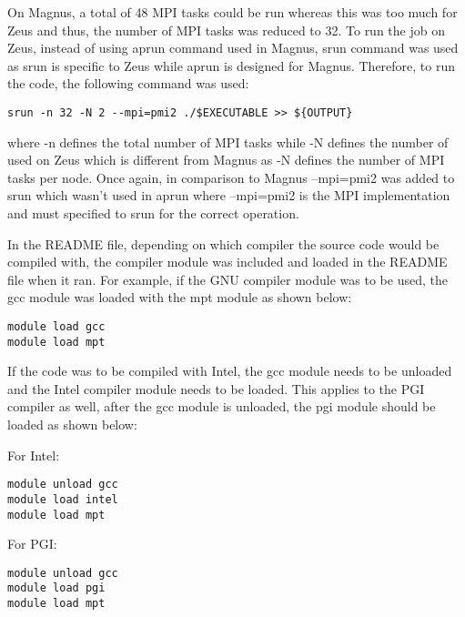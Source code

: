 On Magnus, a total of 48 MPI tasks could be run whereas this was too much for Zeus and thus, the number of MPI tasks was reduced to 32. To run the job
on Zeus, instead of using aprun command used in Magnus, srun command was used as srun is specific to Zeus while aprun is designed for Magnus. Therefore,
to run the code, the following command was used:

\begin{tcolorbox}
\begin{Verbatim}[fontsize=\scriptsize]
srun -n 32 -N 2 --mpi=pmi2 ./$EXECUTABLE >> ${OUTPUT}
\end{Verbatim}
\end{tcolorbox}

where -n defines the total number of MPI tasks while -N defines the number of used on Zeus which is different from Magnus as -N defines the number
of MPI tasks per node. Once again, in comparison to Magnus --mpi=pmi2 was added to srun which wasn't used in aprun where --mpi=pmi2 is the MPI
implementation and must specified to srun for the correct operation.

In the README file, depending on which compiler the source code would be compiled with, the compiler module was included and loaded in the README file 
when it ran. For example, if the GNU compiler module was to be used, the gcc module was loaded with the mpt module as shown below:

\begin{tcolorbox}
\begin{Verbatim}[fontsize=\scriptsize]
module load gcc
module load mpt
\end{Verbatim}
\end{tcolorbox}

If the code was to be compiled with Intel, the gcc module needs to be unloaded and the Intel compiler module needs to be loaded. This applies to the PGI
compiler as well, after the gcc module is unloaded, the pgi module should be loaded as shown below:

For Intel:

\begin{tcolorbox}
\begin{Verbatim}[fontsize=\scriptsize]
module unload gcc
module load intel
module load mpt
\end{Verbatim}
\end{tcolorbox}

For PGI: 

\begin{tcolorbox}
\begin{Verbatim}[fontsize=\scriptsize]
module unload gcc
module load pgi
module load mpt
\end{Verbatim}
\end{tcolorbox}


